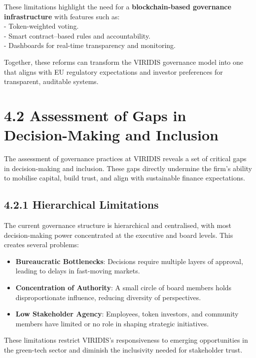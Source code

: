 \documentclass[
  english,
  12pt,
  oneside,
  open=any]{scrbook}
\providecommand{\tightlist}{%
  \setlength{\itemsep}{0pt}\setlength{\parskip}{0pt}}\usepackage{longtable,booktabs,array}
\begin{document}
These limitations highlight the need for a \textbf{blockchain-based
governance infrastructure} with features such as:\\
- Token-weighted voting.\\
- Smart contract--based rules and accountability.\\
- Dashboards for real-time transparency and monitoring.

Together, these reforms can transform the VIRIDIS governance model into
one that aligns with EU regulatory expectations and investor preferences
for transparent, auditable systems.

\section{4.2 Assessment of Gaps in Decision-Making and
Inclusion}\label{sec-gaps}

The assessment of governance practices at VIRIDIS reveals a set of
critical gaps in decision-making and inclusion. These gaps directly
undermine the firm's ability to mobilise capital, build trust, and align
with sustainable finance expectations.

\subsection{4.2.1 Hierarchical Limitations}\label{sec-hier}

The current governance structure is hierarchical and centralised, with
most decision-making power concentrated at the executive and board
levels. This creates several problems:

\begin{itemize}
\tightlist
\item
  \textbf{Bureaucratic Bottlenecks}: Decisions require multiple layers
  of approval, leading to delays in fast-moving markets.\\
\item
  \textbf{Concentration of Authority}: A small circle of board members
  holds disproportionate influence, reducing diversity of
  perspectives.\\
\item
  \textbf{Low Stakeholder Agency}: Employees, token investors, and
  community members have limited or no role in shaping strategic
  initiatives.
\end{itemize}

These limitations restrict VIRIDIS's responsiveness to emerging
opportunities in the green-tech sector and diminish the inclusivity
needed for stakeholder trust.
\end{document}

